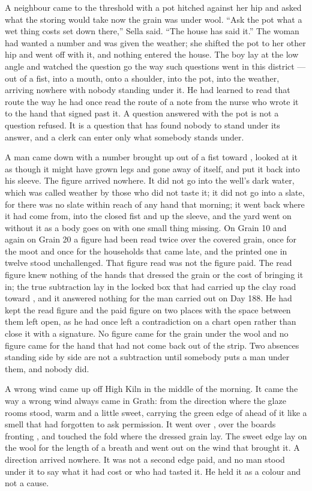 A neighbour came to the threshold with a pot hitched against her hip and asked what the storing would take now the grain was under wool. “Ask the pot what a wet thing costs set down there,” Sella said. “The house has said it.” The woman had wanted a number and was given the weather; she shifted the pot to her other hip and went off with it, and nothing entered the house. The boy lay at the low angle and watched the question go the way such questions went in this district — out of a fist, into a mouth, onto a shoulder, into the pot, into the weather, arriving nowhere with nobody standing under it. He had learned to read that route the way he had once read the route of a note from the nurse who wrote it to the hand that signed past it. A question answered with the pot is not a question refused. It is a question that has found nobody to stand under its answer, and a clerk can enter only what somebody stands under.

A man came down  with a number brought up out of a fist toward , looked at it as though it might have grown legs and gone away of itself, and put it back into his sleeve. The figure arrived nowhere. It did not go into the well's dark water, which was called weather by those who did not taste it; it did not go into a slate, for there was no slate within reach of any hand that morning; it went back where it had come from, into the closed fist and up the sleeve, and the yard went on without it as a body goes on with one small thing missing. On Grain 10 and again on Grain 20 a figure had been read twice over the covered grain, once for the moot and once for the households that came late, and the printed one in twelve stood unchallenged. That figure read was not the figure paid. The read figure knew nothing of the hands that dressed the grain or the cost of bringing it in; the true subtraction lay in the locked box that  had carried up the clay road toward , and it answered nothing for the man carried out on Day 188. He had kept the read figure and the paid figure on two places with the space between them left open, as he had once left a contradiction on a chart open rather than close it with a signature. No figure came for the grain under the wool and no figure came for the hand that had not come back out of the strip. Two absences standing side by side are not a subtraction until somebody puts a man under them, and nobody did.

A wrong wind came up off High Kiln in the middle of the morning. It came the way a wrong wind always came in Grath: from the direction where the glaze rooms stood, warm and a little sweet, carrying the green edge of  ahead of it like a smell that had forgotten to ask permission. It went over , over the boards fronting , and touched the fold where the dressed grain lay. The sweet edge lay on the wool for the length of a breath and went out on the wind that brought it. A direction arrived nowhere. It was not a second edge paid, and no man stood under it to say what it had cost or who had tasted it. He held it as a colour and not a cause.

